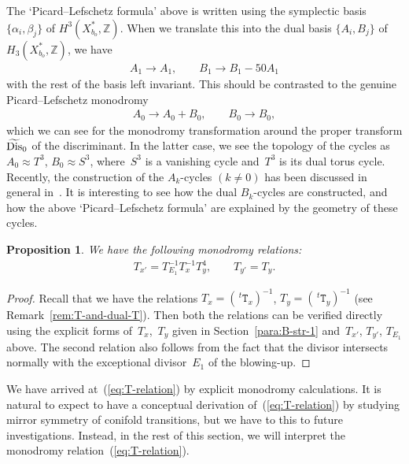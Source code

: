 \documentclass[pdftex]{sigma}
\numberwithin{equation}{section}
\newtheorem{Proposition}[Theorem]{Proposition}
\begin{document}
\begin{Remark} \label{rem:Remark-TE1} The `Picard--Lefschetz formula' above is written using the symplectic basis $\{ \alpha_{i},\beta_{j}\} $ of $H^{3}(X_{b_{o}}^{*},\mathbb{Z})$. When we translate this into the dual basis $\{ A_{i},B_{j}\}$ of $H_{3}(X_{b_{o}}^{*},\mathbb{Z})$, we have
\begin{gather*}
A_{1}\to A_{1},\qquad B_{1}\to B_{1}-50A_{1}
\end{gather*}
with the rest of the basis left invariant. This should be contrasted to the genuine Picard--Lefschetz monodromy
\begin{gather*}
A_{0}\to A_{0}+B_{0},\qquad B_{0}\to B_{0},
\end{gather*}
which we can see for the monodromy transformation around the proper transform $\widetilde{{\rm Dis}}_{0}$ of the discriminant. In the latter case, we see the topology of the cycles as $A_{0}\approx T^{3}$, $B_{0}\approx S^{3}$, where~$S^{3}$ is a vanishing cycle and~$T^{3}$ is its dual torus cycle. Recently, the construction of the $A_{k}$-cycles $(k\not=0)$ has been discussed in general in~\cite{RuddSie}. It is interesting to see how the dual $B_{k}$-cycles are constructed, and how the above `Picard--Lefschetz formula' are explained by the geometry of these cycles.
\end{Remark}

\begin{Proposition}We have the following monodromy relations:
\begin{gather}
\boxed{T_{x'}=T_{E_{1}}^{-1}T_{x}^{-1}T_{y}^{4},\qquad T_{y'}=T_{y}.}\label{eq:T-relation}
\end{gather}
\end{Proposition}
\begin{proof}Recall that we have the relations $T_{x}=(\,^{t}\mathtt{T}_{x})^{-1}$, $T_{y}=(\,^{t}\mathtt{T}_{y})^{-1}$ (see Remark~\ref{rem:T-and-dual-T}). Then both the relations can be verified directly using the explicit forms of~$T_{x}$,~$T_{y}$ given in Section~\ref{para:B-str-1} and~$T_{x'}$, $T_{y'}$, $T_{E_{1}}$ above. The second relation also follows from the fact that the divisor  intersects normally with the exceptional divisor~$E_{1}$ of the blowing-up.
\end{proof}

We have arrived at~(\ref{eq:T-relation}) by explicit monodromy calculations. It is natural to expect to have a conceptual derivation of~(\ref{eq:T-relation}) by studying mirror symmetry of conifold transitions, but we have to this to future investigations. Instead, in the rest of this section, we will interpret the monodromy relation~(\ref{eq:T-relation}).
\end{document}
